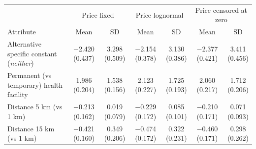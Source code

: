 \begin{tabular}{lcccccc}
\toprule
& \multicolumn{2}{c}{Price fixed} & \multicolumn{2}{c}{Price lognormal} & \multicolumn{2}{c}{Price censored at zero} \\
\cmidrule(lr){2-3}\cmidrule(lr){4-5}\cmidrule(lr){6-7}
Attribute & Mean & SD & Mean & SD & Mean & SD
\\
\midrule
Alternative specific constant (\emph{neither}) & \makecell{$-$2.420 \\ {\footnotesize (0.437)}} & \makecell{3.298 \\ {\footnotesize (0.509)}} & \makecell{$-$2.154 \\ {\footnotesize (0.378)}} & \makecell{3.130 \\ {\footnotesize (0.386)}} & \makecell{$-$2.377 \\ {\footnotesize (0.421)}} & \makecell{3.411 \\ {\footnotesize (0.456)}} \\
Permanent (vs temporary) health facility & \makecell{1.986 \\ {\footnotesize (0.204)}} & \makecell{1.538 \\ {\footnotesize (0.156)}} & \makecell{2.123 \\ {\footnotesize (0.227)}} & \makecell{1.725 \\ {\footnotesize (0.193)}} & \makecell{2.060 \\ {\footnotesize (0.217)}} & \makecell{1.712 \\ {\footnotesize (0.206)}} \\
Distance 5 km (vs 1 km) & \makecell{$-$0.213 \\ {\footnotesize (0.162)}} & \makecell{0.019 \\ {\footnotesize (0.079)}} & \makecell{$-$0.229 \\ {\footnotesize (0.172)}} & \makecell{0.085 \\ {\footnotesize (0.101)}} & \makecell{$-$0.210 \\ {\footnotesize (0.171)}} & \makecell{0.071 \\ {\footnotesize (0.093)}} \\
Distance 15 km (vs 1 km) & \makecell{$-$0.421 \\ {\footnotesize (0.160)}} & \makecell{0.349 \\ {\footnotesize (0.206)}} & \makecell{$-$0.474 \\ {\footnotesize (0.172)}} & \makecell{0.322 \\ {\footnotesize (0.231)}} & \makecell{$-$0.460 \\ {\footnotesize (0.171)}} & \makecell{0.298 \\ {\footnotesize (0.262)}} \\

\end{tabular}
